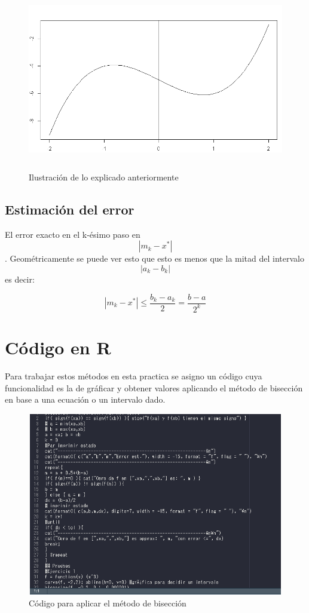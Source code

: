 \documentclass{article}
\begin{document}
\newpage
\begin{figure}[h]
    \centering
    \includegraphics[width=12cm, height=8cm]{RS3.png}
    \caption{Ilustración de lo explicado anteriormente}
    \label{fig:mesh1}
\end{figure}

\subsection{Estimación del error}
El error exacto en el k-ésimo paso en \[|m_{k} - x^{*}|\].
Geométricamente se puede ver esto que esto es menos que la mitad del intervalo \[|a_{k} - b_{k}|\] es decir:
\newline

\begin{equation}
    |m_{k} - x^{*}| \leq \frac{b_{k}-a_{k}}{2}= \frac{b-a}{2^{k}}
\end{equation}

\newpage
\section{Código en R}
Para trabajar estos métodos en esta practica se asigno un código cuya funcionalidad es la de gráficar y obtener valores aplicando el método de bisección en base a una ecuación o un intervalo dado.
\begin{figure}[h]
    \centering
    \includegraphics[width=12cm, height=8cm]{RSC.png}
    \caption{Código para aplicar el método de bisección}
    \label{fig:mesh2}
\end{figure}
\end{document}
